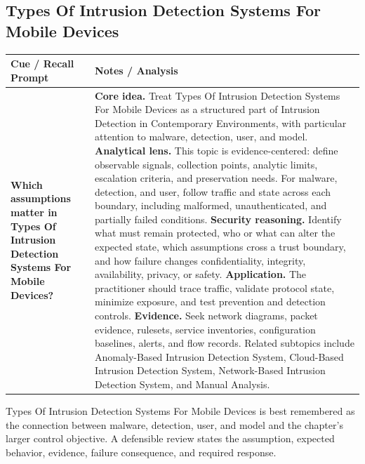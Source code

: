 \documentclass[11pt]{article}
\newcommand{\CornellHeader}{%
\rowcolor{Navy}\color{white}\bfseries Cue / Recall Prompt & \color{white}\bfseries Notes / Analysis\\\hline}
\newcommand{\CornellRow}[2]{%
\cellcolor{CueGray}\RaggedRight\textbf{#1} & \RaggedRight #2\\\hline}
\begin{document}
\subsection*{Types Of Intrusion Detection Systems For Mobile Devices}
\begin{longtable}{>{\RaggedRight\arraybackslash}p{}|>{\RaggedRight\arraybackslash}p{}}
\CornellHeader
\CornellRow{Which assumptions matter in Types Of Intrusion Detection Systems For Mobile Devices?}{\textbf{Core idea.} Treat Types Of Intrusion Detection Systems For Mobile Devices as a structured part of Intrusion Detection in Contemporary Environments, with particular attention to malware, detection, user, and model. \textbf{Analytical lens.} This topic is evidence-centered: define observable signals, collection points, analytic limits, escalation criteria, and preservation needs. For malware, detection, and user, follow traffic and state across each boundary, including malformed, unauthenticated, and partially failed conditions. \textbf{Security reasoning.} Identify what must remain protected, who or what can alter the expected state, which assumptions cross a trust boundary, and how failure changes confidentiality, integrity, availability, privacy, or safety. \textbf{Application.} The practitioner should trace traffic, validate protocol state, minimize exposure, and test prevention and detection controls. \textbf{Evidence.} Seek network diagrams, packet evidence, rulesets, service inventories, configuration baselines, alerts, and flow records. Related subtopics include Anomaly-Based Intrusion Detection System, Cloud-Based Intrusion Detection System, Network-Based Intrusion Detection System, and Manual Analysis.}
\end{longtable}
\begin{topicsummary}
Types Of Intrusion Detection Systems For Mobile Devices is best remembered as the connection between malware, detection, user, and model and the chapter's larger control objective. A defensible review states the assumption, expected behavior, evidence, failure consequence, and required response.
\end{topicsummary}
\end{document}
